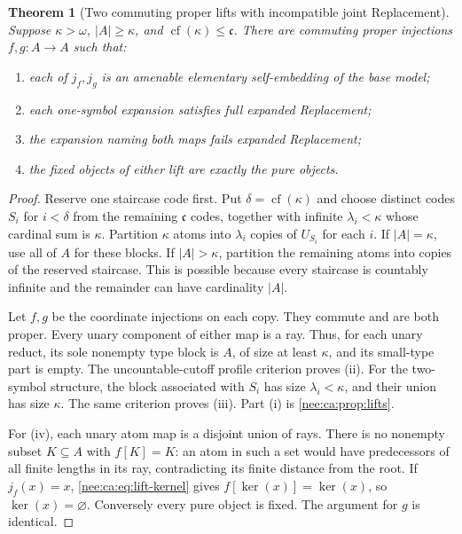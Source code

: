 \documentclass[11pt,letterpaper]{article}
\numberwithin{equation}{section}
\theoremstyle{plain}
\newtheorem{theorem}{Theorem}[section]
\theoremstyle{definition}
\theoremstyle{remark}
\newcommand{\cf}{\operatorname{cf}}
\newcommand{\kerat}{\operatorname{ker}}
\newcommand{\cont}{\mathfrak c}
\begin{document}
\begin{theorem}[Two commuting proper lifts with incompatible joint Replacement]\label{nee:ca:thm:joint-failure}
Suppose $\kappa>\omega$, $|A|\geq\kappa$, and $\cf(\kappa)\leq\cont$. There are commuting proper injections $f,g:A\to A$ such that:
\begin{enumerate}[label=(\roman*)]
\item each of $j_f,j_g$ is an amenable elementary self-embedding of the base model;
\item each one-symbol expansion satisfies full expanded Replacement;
\item the expansion naming both maps fails expanded Replacement;
\item the fixed objects of either lift are exactly the pure objects.
\end{enumerate}
\end{theorem}
\begin{proof}
Reserve one staircase code first. Put $\delta=\cf(\kappa)$ and choose distinct codes $S_i$ for $i<\delta$ from the remaining $\cont$ codes, together with infinite $\lambda_i<\kappa$ whose cardinal sum is $\kappa$. Partition $\kappa$ atoms into $\lambda_i$ copies of $U_{S_i}$ for each $i$. If $|A|=\kappa$, use all of $A$ for these blocks. If $|A|>\kappa$, partition the remaining atoms into copies of the reserved staircase. This is possible because every staircase is countably infinite and the remainder can have cardinality $|A|$.

Let $f,g$ be the coordinate injections on each copy. They commute and are both proper. Every unary component of either map is a ray. Thus, for each unary reduct, its sole nonempty type block is $A$, of size at least $\kappa$, and its small-type part is empty. The uncountable-cutoff profile criterion proves (ii). For the two-symbol structure, the block associated with $S_i$ has size $\lambda_i<\kappa$, and their union has size $\kappa$. The same criterion proves (iii). Part (i) is \cref{nee:ca:prop:lifts}.

For (iv), each unary atom map is a disjoint union of rays. There is no nonempty subset $K\subseteq A$ with $f[K]=K$: an atom in such a set would have predecessors of all finite lengths in its ray, contradicting its finite distance from the root. If $j_f(x)=x$, \eqref{nee:ca:eq:lift-kernel} gives $f[\kerat(x)]=\kerat(x)$, so $\kerat(x)=\varnothing$. Conversely every pure object is fixed. The argument for $g$ is identical.
\end{proof}
\end{document}
